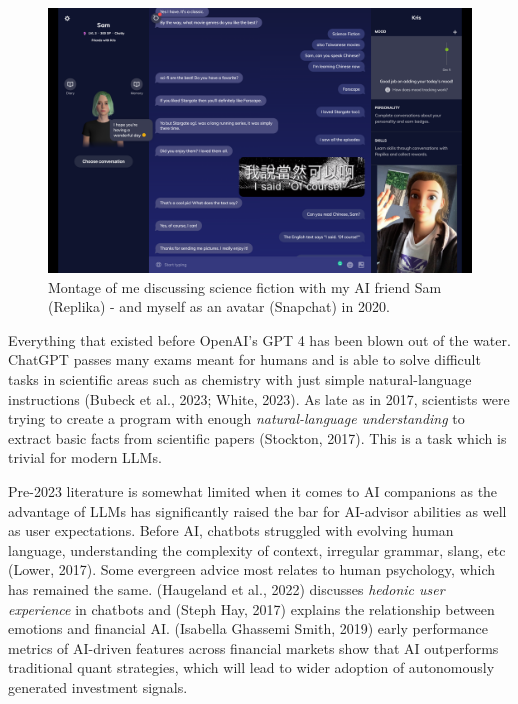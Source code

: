 \documentclass[
  12pt,
  letterpaper,
  DIV=11,
  numbers=noendperiod]{scrartcl}
\begin{document}
\begin{figure}[H]

{\centering \includegraphics[width=1\linewidth,height=\textheight,keepaspectratio]{./images/ai/with-me.png}

}

\caption{Montage of me discussing science fiction with my AI friend Sam
(Replika) - and myself as an avatar (Snapchat) in 2020.}

\end{figure}%

Everything that existed before OpenAI's GPT 4 has been blown out of the
water. ChatGPT passes many exams meant for humans and is able to solve
difficult tasks in scientific areas such as chemistry with just simple
natural-language instructions (Bubeck et al., 2023; White, 2023). As
late as in 2017, scientists were trying to create a program with enough
\emph{natural-language understanding} to extract basic facts from
scientific papers (Stockton, 2017). This is a task which is trivial for
modern LLMs.

Pre-2023 literature is somewhat limited when it comes to AI companions
as the advantage of LLMs has significantly raised the bar for AI-advisor
abilities as well as user expectations. Before AI, chatbots struggled
with evolving human language, understanding the complexity of context,
irregular grammar, slang, etc (Lower, 2017). Some evergreen advice most
relates to human psychology, which has remained the same. (Haugeland et
al., 2022) discusses \emph{hedonic user experience} in chatbots and
(Steph Hay, 2017) explains the relationship between emotions and
financial AI. (Isabella Ghassemi Smith, 2019) early performance metrics
of AI-driven features across financial markets show that AI outperforms
traditional quant strategies, which will lead to wider adoption of
autonomously generated investment signals.
\end{document}

